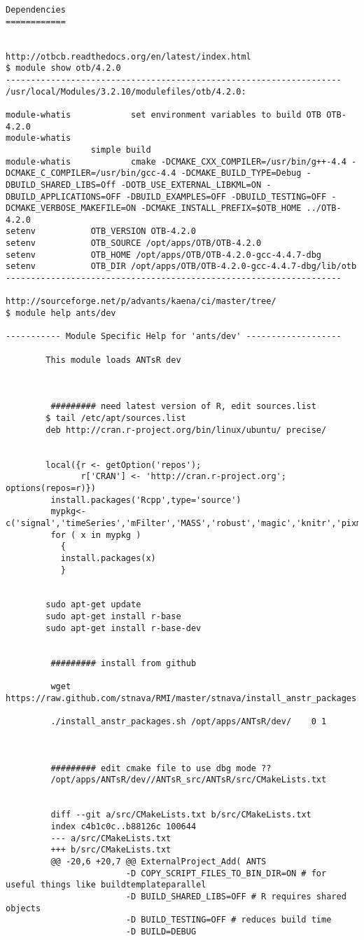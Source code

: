 \documentclass[10pt]{amsart}
\begin{document}
\pagebreak
{\small
\begin{verbatim}
Dependencies
============


http://otbcb.readthedocs.org/en/latest/index.html
$ module show otb/4.2.0
-------------------------------------------------------------------
/usr/local/Modules/3.2.10/modulefiles/otb/4.2.0:

module-whatis            set environment variables to build OTB OTB-4.2.0
module-whatis
                 simple build
module-whatis            cmake -DCMAKE_CXX_COMPILER=/usr/bin/g++-4.4 -DCMAKE_C_COMPILER=/usr/bin/gcc-4.4 -DCMAKE_BUILD_TYPE=Debug -DBUILD_SHARED_LIBS=Off -DOTB_USE_EXTERNAL_LIBKML=ON -DBUILD_APPLICATIONS=OFF -DBUILD_EXAMPLES=OFF -DBUILD_TESTING=OFF -DCMAKE_VERBOSE_MAKEFILE=ON -DCMAKE_INSTALL_PREFIX=$OTB_HOME ../OTB-4.2.0
setenv           OTB_VERSION OTB-4.2.0
setenv           OTB_SOURCE /opt/apps/OTB/OTB-4.2.0
setenv           OTB_HOME /opt/apps/OTB/OTB-4.2.0-gcc-4.4.7-dbg
setenv           OTB_DIR /opt/apps/OTB/OTB-4.2.0-gcc-4.4.7-dbg/lib/otb
-------------------------------------------------------------------

http://sourceforge.net/p/advants/kaena/ci/master/tree/
$ module help ants/dev

----------- Module Specific Help for 'ants/dev' -------------------

        This module loads ANTsR dev



         ######### need latest version of R, edit sources.list
        $ tail /etc/apt/sources.list
        deb http://cran.r-project.org/bin/linux/ubuntu/ precise/


        local({r <- getOption('repos');
               r['CRAN'] <- 'http://cran.r-project.org'; options(repos=r)})
         install.packages('Rcpp',type='source')
         mypkg<-c('signal','timeSeries','mFilter','MASS','robust','magic','knitr','pixmap','rgl','misc3d')
         for ( x in mypkg )
           {
           install.packages(x)
           }


        sudo apt-get update
        sudo apt-get install r-base
        sudo apt-get install r-base-dev


         ######### install from github

         wget https://raw.github.com/stnava/RMI/master/stnava/install_anstr_packages.sh

         ./install_anstr_packages.sh /opt/apps/ANTsR/dev/    0 1



         ######### edit cmake file to use dbg mode ??
         /opt/apps/ANTsR/dev//ANTsR_src/ANTsR/src/CMakeLists.txt


         diff --git a/src/CMakeLists.txt b/src/CMakeLists.txt
         index c4b1c0c..b88126c 100644
         --- a/src/CMakeLists.txt
         +++ b/src/CMakeLists.txt
         @@ -20,6 +20,7 @@ ExternalProject_Add( ANTS
                        -D COPY_SCRIPT_FILES_TO_BIN_DIR=ON # for useful things like buildtemplateparallel
                        -D BUILD_SHARED_LIBS=OFF # R requires shared objects
                        -D BUILD_TESTING=OFF # reduces build time
                        -D BUILD=DEBUG
\end{verbatim}
}

\setlength{\unitlength}{.15cm}

\end{document}
